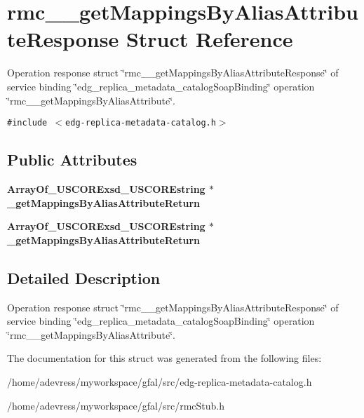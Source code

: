 \section{rmc\_\-\_\-get\-Mappings\-By\-Alias\-Attribute\-Response Struct Reference}
\label{structrmc____getMappingsByAliasAttributeResponse}
Operation response struct \char`\"{}rmc\_\-\_\-get\-Mappings\-By\-Alias\-Attribute\-Response\char`\"{} of service binding \char`\"{}edg\_\-replica\_\-metadata\_\-catalog\-Soap\-Binding\char`\"{} operation \char`\"{}rmc\_\-\_\-get\-Mappings\-By\-Alias\-Attribute\char`\"{}.  


{\tt \#include $<$edg-replica-metadata-catalog.h$>$}

\subsection*{Public Attributes}
\begin{CompactItemize}
\item 
\bf{Array\-Of\_\-USCORExsd\_\-USCOREstring} $\ast$ \textbf{\_\-get\-Mappings\-By\-Alias\-Attribute\-Return}\label{structrmc____getMappingsByAliasAttributeResponse_10c5334aefecc232195e5b5d2562a5f0}

\item 
\bf{Array\-Of\_\-USCORExsd\_\-USCOREstring} $\ast$ \textbf{\_\-get\-Mappings\-By\-Alias\-Attribute\-Return}\label{structrmc____getMappingsByAliasAttributeResponse_10c5334aefecc232195e5b5d2562a5f0}

\end{CompactItemize}


\subsection{Detailed Description}
Operation response struct \char`\"{}rmc\_\-\_\-get\-Mappings\-By\-Alias\-Attribute\-Response\char`\"{} of service binding \char`\"{}edg\_\-replica\_\-metadata\_\-catalog\-Soap\-Binding\char`\"{} operation \char`\"{}rmc\_\-\_\-get\-Mappings\-By\-Alias\-Attribute\char`\"{}. 



The documentation for this struct was generated from the following files:\begin{CompactItemize}
\item 
/home/adevress/myworkspace/gfal/src/edg-replica-metadata-catalog.h\item 
/home/adevress/myworkspace/gfal/src/rmc\-Stub.h\end{CompactItemize}
